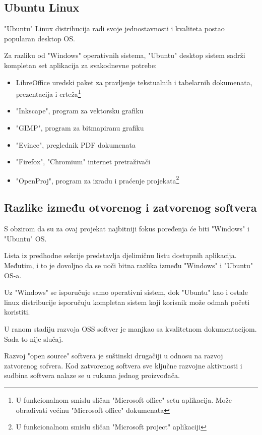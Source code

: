 \documentclass[times, utf8, seminar]{fit}
\begin{document}
\subsection{Ubuntu Linux}
"Ubuntu" Linux distribucija radi svoje jednostavnosti i kvaliteta postao popularan desktop OS.

Za razliku od "Windows" operativnih sistema, "Ubuntu" desktop sistem sadrži kompletan set aplikacija za svakodnevne potrebe:
\begin{itemize}
  \item LibreOffice uredski paket za pravljenje tekstualnih i tabelarnih dokumenata, prezentacija i crteža\footnote{U funkcionalnom smislu sličan "Microsoft office" setu aplikacija. Može obrađivati većinu "Microsoft office" dokumenata}
  \item "Inkscape", program za vektorsku grafiku \cite{inkscape}
  \item "GIMP", program za bitmapiranu grafiku
  \item "Evince", preglednik PDF dokumenata
  \item "Firefox", "Chromium" internet pretraživači
  \item "OpenProj", program za izradu i praćenje projekata\footnote{U funkcionalnom smislu sličan "Microsoft project" aplikaciji}
\end{itemize}  

 
\subsection{Razlike između otvorenog i zatvorenog softvera} 

S obzirom da su za ovaj projekat najbitniji fokus poređenja će biti "Windows" i "Ubuntu" OS. 

Lista iz predhodne sekcije predstavlja djelimičnu listu dostupnih aplikacija. Međutim, i to je dovoljno da se uoči bitna razlika između "Windows" i "Ubuntu" OS-a. 

Uz "Windows" se isporučuje samo operativni sistem, dok "Ubuntu" kao i ostale linux distribucije isporučuju kompletan sistem koji korisnik može odmah početi koristiti.

U ranom stadiju razvoja OSS softver je manjkao sa kvalitetnom dokumentacijom. Sada to nije slučaj. 

Razvoj "open source" softvera je suštinski drugačiji u odnosu na razvoj zatvorenog sofvera. Kod zatvorenog softvera sve ključne razvojne aktivnosti i sudbina softvera nalaze se u rukama jednog proizvođača.
\end{document}
